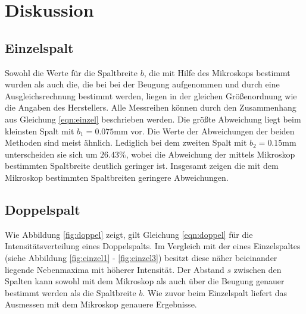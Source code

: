 \section{Diskussion}
\label{sec:Diskussion}

\subsection{Einzelspalt}
Sowohl die Werte für die Spaltbreite $b$, die mit Hilfe des Mikroskops bestimmt wurden als auch die, die bei bei der Beugung aufgenommen und durch eine Ausgleichsrechnung bestimmt werden, liegen in der gleichen Größenordnung wie die Angaben des Herstellers. Alle Messreihen können durch den Zusammenhang aus Gleichung \ref{eqn:einzel} beschrieben werden. Die größte Abweichung liegt  beim kleinsten Spalt mit $b_1=0.075 \si{\milli\meter}$ vor. Die Werte der Abweichungen der beiden Methoden sind meist ähnlich. Lediglich bei dem zweiten Spalt mit $b_2=0.15   \si{\milli\meter}$ unterscheiden sie sich um $26.43\%$, wobei die Abweichung der mittels Mikroskop bestimmten Spaltbreite deutlich geringer ist. Insgesamt zeigen die mit dem Mikroskop bestimmten Spaltbreiten geringere Abweichungen.

\subsection{Doppelspalt}
Wie Abbildung \ref{fig:doppel} zeigt, gilt Gleichung \ref{eqn:doppel} für die Intensitätsverteilung eines Doppelspalts. Im Vergleich mit der eines Einzelspaltes (siehe Abbildung \ref{fig:einzel1} -  \ref{fig:einzel3}) besitzt diese näher beieinander liegende Nebenmaxima mit höherer Intensität. Der Abstand $s$ zwischen den Spalten kann sowohl mit dem Mikroskop als auch über die Beugung genauer bestimmt werden als die Spaltbreite $b$. Wie zuvor beim Einzelspalt liefert das Ausmessen mit dem Mikroskop genauere Ergebnisse.
